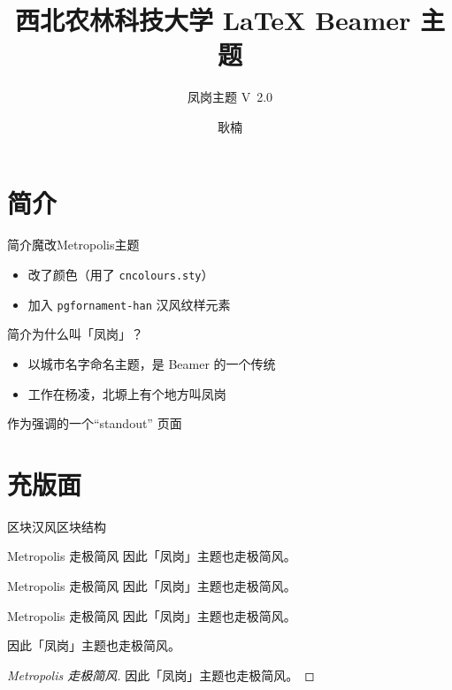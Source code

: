 \documentclass[t, aspectratio=169]{ctexbeamer}
\title[凤岗主题]{\Large 西北农林科技大学 {\LaTeX}  Beamer 主题}
\subtitle{凤岗主题 V\ 2.0}
\author[N. Geng]{耿楠}
\date{\tosemester} %
\institute[智能媒体]{智能媒体实验室}
\begin{document}
\begin{frame}[plain]
  \maketitle
\end{frame}

\section{简介}

\begin{frame}{简介}{魔改Metropolis主题}
  \begin{itemize}
    \item 改了颜色（用了 \texttt{cncolours.sty}）
    \item 加入 \texttt{pgfornament-han} 汉风纹样元素
  \end{itemize}
\end{frame}

\begin{frame}{简介}{为什么叫「凤岗」？}
  \begin{itemize}
    \item 以城市名字命名主题，是 Beamer 的一个传统
    \item 工作在杨凌，北塬上有个地方叫\alert{凤岗}
  \end{itemize}
\end{frame}

\begin{frame}
作为强调的一个\enquote{standout} 页面
\end{frame}

\section{充版面}

\begin{frame}[allowframebreaks]{区块}{汉风区块结构}

  \begin{block}{Metropolis 走极简风}
    因此「凤岗」主题也走极简风。
  \end{block}

  \begin{exampleblock}{Metropolis 走极简风}
    因此「凤岗」主题也走极简风。
  \end{exampleblock}

  \begin{alertblock}{Metropolis 走极简风}
    因此「凤岗」主题也走极简风。
  \end{alertblock}

  \begin{theorem}
    因此「凤岗」主题也走极简风。
  \end{theorem}

  \begin{proof}[Metropolis 走极简风]
    因此「凤岗」主题也走极简风。
  \end{proof}
\end{frame}
\end{document}
